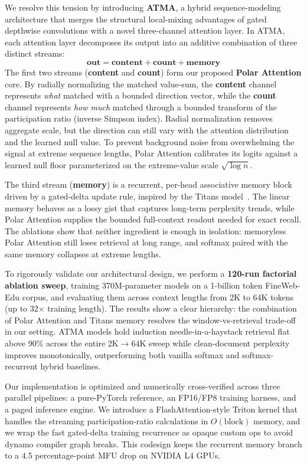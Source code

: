 \documentclass{article} %
\begin{document}
We resolve this tension by introducing \textbf{ATMA}, a hybrid sequence-modeling architecture that merges the structural local-mixing advantages of gated depthwise convolutions with a novel three-channel attention layer. In ATMA, each attention layer decomposes its output into an additive combination of three distinct streams:
\begin{equation}
    \mathbf{out} = \mathbf{content} + \mathbf{count} + \mathbf{memory}
\end{equation}
The first two streams (\textbf{content} and \textbf{count}) form our proposed \textbf{Polar Attention} core. By radially normalizing the matched value-sum, the \textbf{content} channel represents \textit{what} matched with a bounded direction vector, while the \textbf{count} channel represents \textit{how much} matched through a bounded transform of the participation ratio (inverse Simpson index). Radial normalization removes aggregate scale, but the direction can still vary with the attention distribution and the learned null value. To prevent background noise from overwhelming the signal at extreme sequence lengths, Polar Attention calibrates its logits against a learned null floor parameterized on the extreme-value scale $\sqrt{\log n}$.

The third stream (\textbf{memory}) is a recurrent, per-head associative memory block driven by a gated-delta update rule, inspired by the Titans model~\citep{titans2025}. The linear memory behaves as a lossy gist that captures long-term perplexity trends, while Polar Attention supplies the bounded full-context readout needed for exact recall. The ablations show that neither ingredient is enough in isolation: memoryless Polar Attention still loses retrieval at long range, and softmax paired with the same memory collapses at extreme lengths.

To rigorously validate our architectural design, we perform a \textbf{120-run factorial ablation sweep}, training 370M-parameter models on a 1-billion token FineWeb-Edu corpus, and evaluating them across context lengths from 2K to 64K tokens (up to 32$\times$ training length). The results show a clear hierarchy: the combination of Polar Attention and Titans memory resolves the window-vs-retrieval trade-off in our setting. ATMA models hold induction needle-in-a-haystack retrieval flat above 90\% across the entire 2K$\to$64K sweep while clean-document perplexity improves monotonically, outperforming both vanilla softmax and softmax-recurrent hybrid baselines.

Our implementation is optimized and numerically cross-verified across three parallel pipelines: a pure-PyTorch reference, an FP16/FP8 training harness, and a paged inference engine. We introduce a FlashAttention-style Triton kernel that handles the streaming participation-ratio calculations in $O(\text{block})$ memory, and we wrap the fast gated-delta training recurrence as opaque custom ops to avoid dynamo compiler graph breaks. This codesign keeps the recurrent memory branch to a 4.5 percentage-point MFU drop on NVIDIA L4 GPUs.
\end{document}
